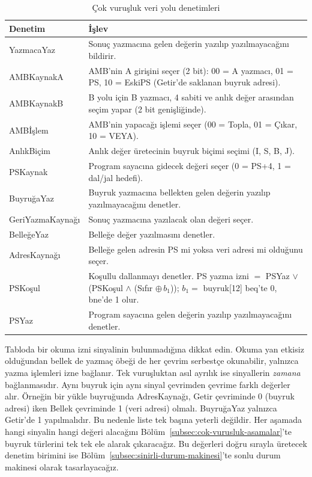\begin{table}[H]
\centering
\caption{Çok vuruşluk veri yolu denetimleri}
\label{tab:cok-vurusluk-denetim}
\small
\begin{tabular}{lp{10cm}}
\toprule
\textbf{Denetim} & \textbf{İşlev} \\
\midrule
YazmacaYaz & Sonuç yazmacına gelen değerin yazılıp yazılmayacağını bildirir. \\
AMBKaynakA & AMB'nin A girişini seçer (2 bit): 00 = A yazmacı, 01 = PS, 10 = EskiPS (Getir'de saklanan buyruk adresi). \\
AMBKaynakB & B yolu için B yazmacı, 4 sabiti ve anlık değer arasından seçim yapar (2 bit genişliğinde). \\
AMBİşlem & AMB'nin yapacağı işlemi seçer (00 = Topla, 01 = Çıkar, 10 = VEYA). \\
AnlıkBiçim & Anlık değer üretecinin buyruk biçimi seçimi (I, S, B, J). \\
PSKaynak & Program sayacına gidecek değeri seçer (0 = PS+4, 1 = dal/jal hedefi). \\
BuyruğaYaz & Buyruk yazmacına bellekten gelen değerin yazılıp yazılmayacağını denetler. \\
GeriYazmaKaynağı & Sonuç yazmacına yazılacak olan değeri seçer. \\
BelleğeYaz & Belleğe değer yazılmasını denetler. \\
AdresKaynağı & Belleğe gelen adresin PS mi yoksa veri adresi mi olduğunu seçer. \\
PSKoşul & Koşullu dallanmayı denetler. PS yazma izni $=$ PSYaz $\lor$ (PSKoşul $\land$ (Sıfır $\oplus\, b_1$)); $b_1 = $ buyruk[12] beq'te 0, bne'de 1 olur. \\
PSYaz & Program sayacına gelen değerin yazılıp yazılmayacağını denetler. \\
\bottomrule
\end{tabular}
\end{table}

Tabloda bir okuma izni sinyalinin bulunmadığına dikkat edin. Okuma yan etkisiz olduğundan bellek de yazmaç öbeği de her çevrim serbestçe okunabilir, yalnızca yazma işlemleri izne bağlanır. Tek vuruşluktan asıl ayrılık ise sinyallerin \emph{zamana} bağlanmasıdır. Aynı buyruk için aynı sinyal çevrimden çevrime farklı değerler alır. Örneğin bir yükle buyruğunda AdresKaynağı, Getir çevriminde 0 (buyruk adresi) iken Bellek çevriminde 1 (veri adresi) olmalı. BuyruğaYaz yalnızca Getir'de 1 yapılmalıdır. Bu nedenle liste tek başına yeterli değildir. Her aşamada hangi sinyalin hangi değeri alacağını Bölüm~\ref{subsec:cok-vurusluk-asamalar}'te buyruk türlerini tek tek ele alarak çıkaracağız. Bu değerleri doğru sırayla üretecek denetim birimini ise Bölüm~\ref{subsec:sinirli-durum-makinesi}'te sonlu durum makinesi olarak tasarlayacağız.

